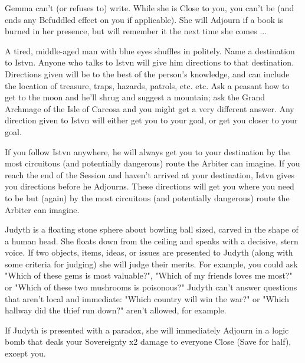 Gemma can't (or refuses to) write.  While she is Close to you, you can't be  (and ends any Befuddled effect on you if applicable). She will Adjourn if a book is burned in her presence, but will remember it the next time she comes ...


A tired, middle-aged man with blue eyes shuffles in politely. Name a destination to Istv{\AccentA}n. Anyone who talks to Istv{\AccentA}n will give him directions to that destination.  Directions given will be to the best of the person's knowledge, and can include the location of treasure, traps, hazards, patrols, etc. etc.  Ask a peasant how to get to the moon and he'll shrug and suggest a mountain; ask the Grand Archmage of the Isle of Carcosa and you might get a very different answer. Any direction given to Istv{\AccentA}n will either get you to your goal, or get you closer to your goal.

If you follow Istv{\AccentA}n anywhere, he will always get you to your destination by the most circuitous (and potentially dangerous) route the Arbiter can imagine. If you reach the end of the Session and haven't arrived at your destination, Istv{\AccentA}n gives you directions before he Adjourns. These directions will get you where you need to be but (again) by the most circuitous (and potentially dangerous) route the Arbiter can imagine.



Judyth is a floating stone sphere about bowling ball sized, carved in the shape of a human head.  She floats down from the ceiling and speaks with a decisive, stern voice.  If two objects, items, ideas, or issues are presented to Judyth (along with some criteria for judging) she will judge their merits. For example, you could ask "Which of these gems is most valuable?", "Which of my friends loves me most?" or "Which of these two mushrooms is poisonous?" Judyth can't answer questions that aren't local and immediate:  "Which country will win the war?" or "Which hallway did the thief run down?" aren't allowed, for example.  

If Judyth is presented with a paradox, she will immediately Adjourn in a logic bomb that deals your Sovereignty x2 damage to everyone Close (Save for half), except you.


